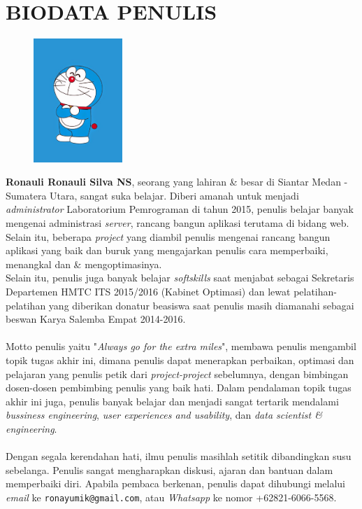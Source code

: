 \chapter{BIODATA PENULIS}
		\begin{figure}
			\includegraphics[width=0.3\textwidth]{images/foto-diri.jpg}
		\end{figure}
		\textbf{Ronauli Ronauli Silva NS}, seorang yang lahiran \& besar di Siantar Medan - Sumatera Utara, sangat suka belajar. Diberi amanah untuk menjadi \textit{administrator} Laboratorium Pemrograman di tahun 2015, penulis belajar banyak mengenai administrasi \textit{server}, rancang bangun aplikasi terutama di bidang web. Selain itu, beberapa \textit{project} yang diambil penulis mengenai rancang bangun aplikasi yang baik dan buruk yang mengajarkan penulis cara memperbaiki, menangkal dan \& mengoptimasinya.\\
		Selain itu, penulis juga banyak belajar \textit{softskills} saat menjabat sebagai Sekretaris Departemen HMTC ITS 2015/2016 (Kabinet Optimasi) dan lewat pelatihan-pelatihan yang diberikan donatur beasiswa saat penulis masih diamanahi sebagai beswan Karya Salemba Empat 2014-2016.\\ \\
		Motto penulis yaitu "\textit{Always go for the extra miles}", membawa penulis mengambil topik tugas akhir ini, dimana penulis dapat menerapkan perbaikan, optimasi dan pelajaran yang penulis petik dari \textit{project-project} sebelumnya, dengan bimbingan dosen-dosen pembimbing penulis yang baik hati. Dalam pendalaman topik tugas akhir ini juga, penulis banyak belajar dan menjadi sangat tertarik mendalami \textit{bussiness engineering}, \textit{user experiences and usability}, dan \textit{data scientist \& engineering}. \\ \\
		Dengan segala kerendahan hati, ilmu penulis masihlah setitik dibandingkan susu sebelanga. Penulis sangat mengharapkan diskusi, ajaran dan bantuan dalam memperbaiki diri. Apabila pembaca berkenan, penulis dapat dihubungi melalui \textit{email} ke \texttt{ronayumik@gmail.com}, atau \textit{Whatsapp} ke nomor +62821-6066-5568.



